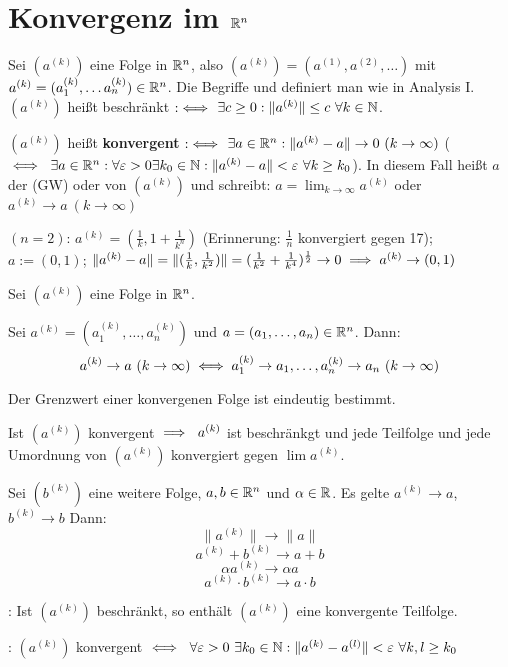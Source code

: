 \documentclass[a4paper,twoside,DIV15,BCOR12mm]{scrbook}
\begin{document}
\chapter{Konvergenz im $\mathbb{R}^n$}

Sei $(a^{(k)})$ eine Folge in $\mathbb{R}^n$, also $(a^{(k)}) = ( a^{(1)}, a^{(2)}, \ldots ) $ mit $a^{(k)} = (a_1^{(k)}, \ldots a_n^{(k)}) \in \mathbb{R}^n$. Die Begriffe  und  definiert man wie in Analysis I. $(a^{(k)})$ heißt beschränkt $:\iff$ $\exists c\ge0: \|a^{(k)}\| \le c  \ \forall k\in\mathbb{N}$.

\begin{definition*}
$(a^{(k)})$ heißt \textbf{konvergent} $:\iff$ $\exists a\in\mathbb{R}^n: \|a^{(k)} - a\| \to 0 \ (k\to\infty)$ ($\iff\ \exists a\in\mathbb{R}^n: \forall \varepsilon>0\exists k_0 \in\mathbb{N}: \|a^{(k)} - a\|<\varepsilon \ \forall k\ge k_0$). In diesem Fall heißt $a$ der  (GW) oder  von $(a^{(k)})$ und schreibt: $a=\lim_{k\to\infty}a^{(k)}$ oder $a^{(k)} \to a \ (k\to\infty)$
\end{definition*}

\begin{beispiel}
$(n=2)$: $a^{(k)} = (\frac{1}{k}, 1+\frac{1}{k^n})$ (Erinnerung: $\frac{1}{n}$ konvergiert gegen 17); $a := (0,1)$; $\|a^{(k)} - a \| = \|(\frac{1}{k} , \frac{1}{k^2})\| = (\frac{1}{k^2} + \frac{1}{k^4})^\frac{1}{2} \to 0 \implies a^{(k)} \to (0,1)$
\end{beispiel}
\begin{satz}[Konvergenz]
Sei $(a^{(k)})$ eine Folge in $\mathbb{R}^n$.
\begin{liste}
 \item Sei $a^{(k)} = (a_1^{(k)}, \ldots, a_n^{(k)})$ und $a = (a_1,\ldots,a_n)\in\mathbb{R}^n$. Dann:
 $$ a^{(k)} \to a \ (k\to\infty) \iff a_1^{(k)} \to a_1, \ldots, a_n^{(k)} \to a_n \ (k\to\infty) $$
 \item Der Grenzwert einer konvergenen Folge ist eindeutig bestimmt.
 \item Ist $(a^{(k)})$ konvergent $\implies \ a^{(k)}$ ist beschränkgt und jede Teilfolge und jede Umordnung von $(a^{(k)})$ konvergiert gegen $\lim a^{(k)}$.
 \item Sei $(b^{(k)})$ eine weitere Folge, $a,b\in\mathbb{R}^n$ und $\alpha\in\mathbb{R}$. Es gelte $a^{(k)}\to a$, $b^{(k)} \to b$ Dann: $$\|a^{(k)}\| \to \|a\|$$ $$a^{(k)} + b ^{(k)} \to a+b$$ $$\alpha a^{(k)} \to \alpha a$$ $$a^{(k)}\cdot b^{(k)} \to a\cdot b$$
 \item {}: Ist $(a^{(k)})$ beschränkt, so enthält $(a^{(k)})$ eine konvergente Teilfolge.
 \item {}: $(a^{(k)})$ konvergent $\iff \ \forall\varepsilon>0\ \exists k_0\in\mathbb{N}: \|a^{(k)} - a^{(l)}\| <\varepsilon \ \forall k,l \ge k_0$
\end{liste}
\end{satz}
\end{document}
